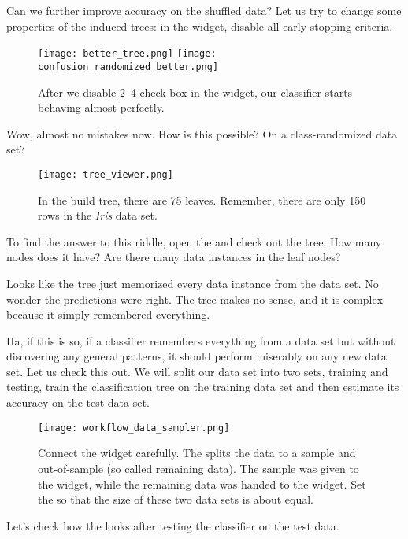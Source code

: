 Can we further improve accuracy on the shuffled data? Let us try to change some properties of the induced trees: in the  widget, disable all early stopping criteria.

\begin{figure}[h]
    \texttt{[image: better\_tree.png]}
    \texttt{[image: confusion\_randomized\_better.png]}
    \caption{After we disable 2--4 check box in the  widget, our classifier starts behaving almost perfectly.}
\end{figure}


Wow, almost no mistakes now. How is this possible? On a class-randomized data set?

\begin{wrapfigure}{o}{0.85\textwidth}
    \texttt{[image: tree\_viewer.png]}
    \caption{In the build tree, there are 75 leaves. Remember, there are only 150 rows in the \textit{Iris} data set.}
\end{wrapfigure}

To find the answer to this riddle, open the  and check out the tree. How many nodes does it have? Are there many data instances in the leaf nodes?

Looks like the tree just memorized every data instance from the data set. No wonder the predictions were right. The tree makes no sense, and it is complex because it simply remembered everything.

Ha, if this is so, if a classifier remembers everything from a data set but without discovering any general patterns, it should perform miserably on any new data set. Let us check this out. We will split our data set into two sets, training and testing, train the classification tree on the training data set and then estimate its accuracy on the test data set.

\begin{figure}[h]
    \texttt{[image: workflow\_data\_sampler.png]}
    \caption{Connect the  widget carefully. The  splits the data to a sample and out-of-sample (so called remaining data). The sample was given to the  widget, while the remaining data was handed to the  widget. Set the  so that the size of these two data sets is about equal.}
\end{figure}

Let’s check how the  looks after testing the classifier on the test data.

